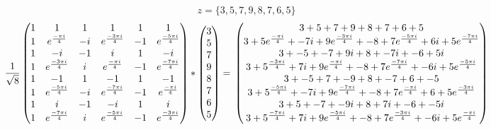 \documentclass{article}
\begin{document}
\[	z = \{3, 5, 7, 9, 8, 7, 6, 5\}  \]
\[ 
  \frac{1}{\sqrt{8}}
	\begin{pmatrix}
		1 & 1                      & 1  & 1                      & 1  & 1             \\
		1 & e^{\frac{- \pi i}{4}}  & -i & e^{\frac{-3 \pi i}{4}} & -1 & e^{\frac{-5 \pi i}{4}}        \\
		1 & -i                     & -1 & i                      & 1  & -i        \\
		1 & e^{\frac{-3 \pi i}{4}} & i  & e^{\frac{- \pi i}{4}}  & -1 & e^{\frac{-7 \pi i}{4}}      \\
		1 & -1                     & 1  & -1                     & 1  & -1         \\
		1 & e^{\frac{-5 \pi i}{4}} & -i & e^{\frac{-7 \pi i}{4}} & -1 & e^{\frac{- \pi i}{4}}         \\
		1 & i                      & -1 & -i                     & 1  & i        \\
		1 & e^{\frac{-7 \pi i}{4}} & i  & e^{\frac{-5 \pi i}{4}} & -1 & e^{\frac{-3 \pi i}{4}}
	\end{pmatrix}
	*
	\begin{pmatrix}
		3 \\
		5 \\
		7 \\
		9 \\
		8 \\
		7 \\
		6 \\
		5 
	\end{pmatrix}
	=  \\
	\begin{pmatrix}
		3 + 5                       + 7   + 9                        + 8  + 7                        + 6   + 5 \\
		3 + 5 e^{\frac{- \pi i}{4}} + -7i + 9e^{\frac{-3 \pi i}{4}}  + -8 + 7 e^{\frac{-5 \pi i}{4}} + 6i  + 5 e^{\frac{-7 \pi i}{4}}  \\
		3 + -5                      + -7  + 9i                       + 8  + -7i                      + -6  + 5i \\
		3 + 5^{\frac{- 3 \pi i}{4}} + 7i  + 9 e^{\frac{- \pi i}{4}}  + -8 + 7 e^{\frac{- 7\pi i}{4}} + -6i + 5e^{\frac{-5 \pi i}{4}} \\
		3 + -5                      + 7   + -9                       + 8  + -7                       + 6   + -5 \\
		3 + 5^{\frac{-5\pi i}{4}}   + -7i + 9 e^{\frac{-7 \pi i}{4}} + -8 + 7 e^{\frac{- \pi i}{4}}  + 6   + 5 e^{\frac{-3\pi i}{4}} \\
		3 + 5                       + -7  + -9i                      + 8  + 7i                       + -6  + -5i \\
		3 + 5^{\frac{-7\pi i}{4}}   + 7i  + 9 e^{\frac{-5\pi i}{4}}  + -8 + 7 e^{\frac{-3\pi i}{4}}  + -6i + 5 e^{\frac{- \pi i}{4}}
	\end{pmatrix}
\]
\end{document}
